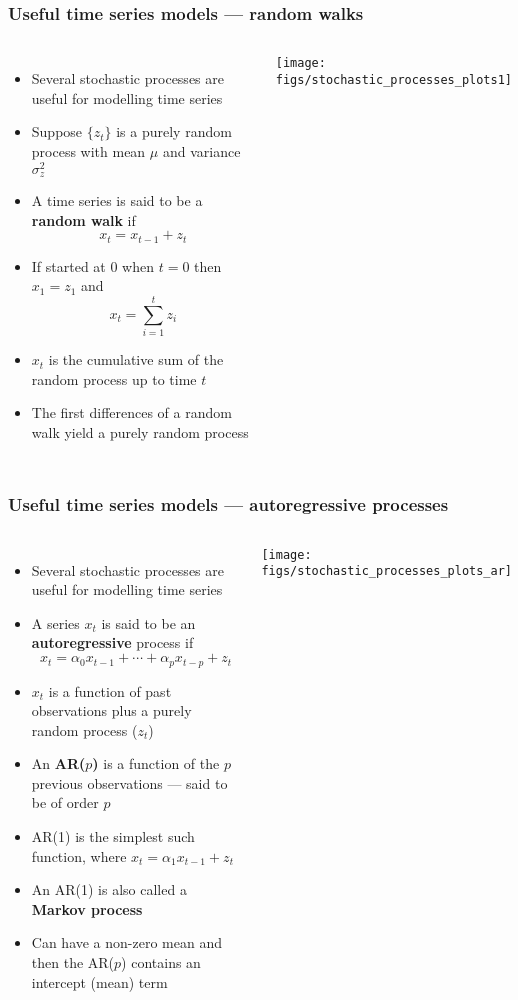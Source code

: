 \documentclass{beamer}
\begin{document}
\begin{frame}
    \frametitle{Useful time series models --- random walks}
    \small
    \begin{columns}
    \column{7cm}
        \begin{itemize}
            \item Several stochastic processes are useful for modelling time series
            \item Suppose $\{z_t\}$ is a purely random process with mean $\mu$ and variance $\sigma^2_z$
            \item A time series is said to be a \textbf{random walk} if
            $$x_t = x_{t-1} + z_t$$
            \item If started at 0 when $t=0$ then $x_1 = z_1$ and
            $$x_t = \sum \limits_{i=1}^t z_i$$
            \item $x_t$ is the cumulative sum of the random process up to time $t$
            \item The first differences of a random walk yield a purely random process
        \end{itemize}
    \column{5cm}
    \texttt{[image: figs/stochastic\_processes\_plots1]}
    \end{columns}
    \normalsize
\end{frame}

\begin{frame}
    \frametitle{Useful time series models --- autoregressive processes}
    \small
    \begin{columns}
    \column{7cm}
        \begin{itemize}
            \item Several stochastic processes are useful for modelling time series
            \item A series $x_t$ is said to be an \textbf{autoregressive} process if
            $$x_t = \alpha_0 x_{t-1} + \cdots + \alpha_p x_{t-p} + z_t$$
            \item $x_t$ is a function of past observations plus a purely random process ($z_t$)
            \item An \textbf{AR($p$)} is a function of the $p$ previous observations --- said to be of order $p$
            \item AR(1) is the simplest such function, where $x_t = \alpha_1 x_{t-1} + z_t$
            \item An AR(1) is also called a \textbf{Markov process}
            \item Can have a non-zero mean and then the AR($p$) contains an intercept (mean) term
        \end{itemize}
    \column{5cm}
    \texttt{[image: figs/stochastic\_processes\_plots\_ar]}
    \end{columns}
    \normalsize
\end{frame}
\end{document}
